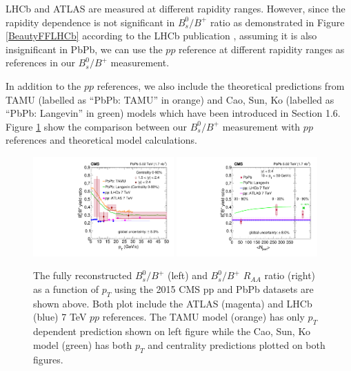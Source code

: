 LHCb and ATLAS are measured at different rapidity ranges. However, since the rapidity dependence is not significant in $B^0_s/B^+$ ratio as demonstrated in Figure \ref{BeautyFFLHCb} according to the LHCb publication \cite{LHCbFF}, assuming it is also insignificant in PbPb, we can use the $pp$ reference at different rapidity ranges as references in our $B^0_s/B^+$ measurement.

In addition to the $pp$ references, we also include the theoretical predictions from TAMU (labelled as ``PbPb: TAMU'' in orange) and Cao, Sun, Ko (labelled as ``PbPb: Langevin'' in green) models which have been introduced in Section 1.6. Figure \ref{FinalResults} show the comparison between our $B^0_s/B^+$ measurement with $pp$ references and theoretical model calculations. 

\begin{figure}[hbtp]
\begin{center}
\includegraphics[width=0.48\textwidth]{Figures/Chapter6/ratio_vsPt_ref1_1.pdf}
\includegraphics[width=0.48\textwidth]{Figures/Chapter6/ratio_vsCent_ref1.pdf}
\caption{The fully reconstructed $B^0_s/B^+$ (left) and $B^0_s/B^+$ $R_{AA}$ ratio (right) as a function of $p_T$ using the 2015 CMS pp and PbPb datasets are shown above. Both plot include the ATLAS (magenta) and LHCb (blue) 7 TeV $pp$ references. The TAMU model (orange) has only $p_T$ dependent prediction shown on left figure while the Cao, Sun, Ko model (green) has both $p_T$ and centrality predictions plotted on both figures.}
\label{FinalResults}
\end{center}
\end{figure}   
 

